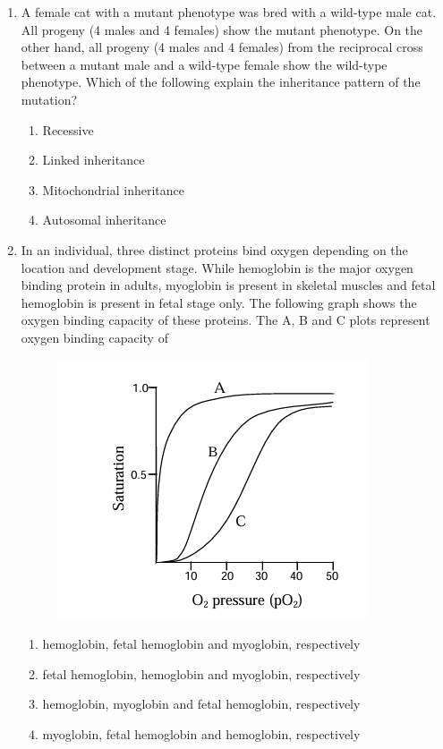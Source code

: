 \documentclass[journal,12pt,onecolumn]{IEEEtran}
\begin{document}
\begin{enumerate}[label=\arabic*.]
\item A female cat with a mutant phenotype was bred with a wild-type male cat. All progeny (4 males and 4 females) show the mutant phenotype. On the other hand, all progeny (4 males and 4 females) from the reciprocal cross between a mutant male and a wild-type female show the wild-type phenotype. Which of the following explain the inheritance pattern of the mutation?
\begin{multicols}{2}
\begin{enumerate}[label=(\Alph*)]
\item Recessive
\item Linked inheritance
\item Mitochondrial inheritance
\item Autosomal inheritance
\end{enumerate}
\end{multicols}

\item In an individual, three distinct proteins bind oxygen depending on the location and development stage. While hemoglobin is the major oxygen binding protein in adults, myoglobin is present in skeletal muscles and fetal hemoglobin is present in fetal stage only. The following graph shows the oxygen binding capacity of these proteins. The A, B and C plots represent oxygen binding capacity of
\begin{figure}[H]
    \centering
    \includegraphics[width=0.7\columnwidth]{FIG/L-17.png}
    \caption*{}
    \label{fig:L-17}
\end{figure}
\begin{enumerate}[label=(\Alph*)]
\item hemoglobin, fetal hemoglobin and myoglobin, respectively
\item fetal hemoglobin, hemoglobin and myoglobin, respectively
\item hemoglobin, myoglobin and fetal hemoglobin, respectively
\item myoglobin, fetal hemoglobin and hemoglobin, respectively
\end{enumerate}


\end{enumerate}
\end{document}
